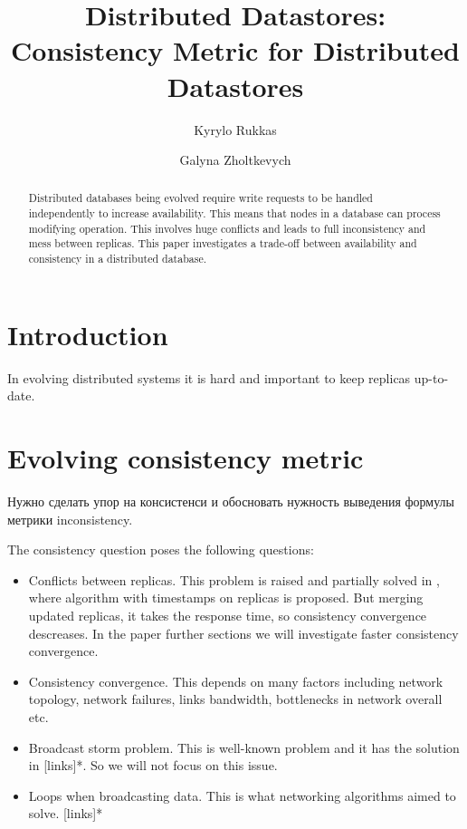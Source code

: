 \documentclass{llncs}
\begin{document}
\title{Distributed Datastores: Consistency Metric for Distributed Datastores}
\author{Kyrylo Rukkas\and Galyna Zholtkevych}
\maketitle
\begin{abstract}
Distributed databases being evolved require write requests to be handled independently to increase availability.
This means that nodes in a database can process modifying operation. This involves huge conflicts and leads to
full inconsistency and mess between replicas. This paper investigates a trade-off between availability and consistency
in a distributed database.
\end{abstract}

\section{Introduction}\label{sec:intro}
In evolving distributed systems it is hard and important to keep replicas up-to-date.

\section{Evolving consistency metric}
Нужно сделать упор на консистенси и обосновать нужность выведения формулы метрики inconsistency.


The consistency question poses the following questions:
\begin{itemize}
\item Conflicts between replicas. This problem is raised and partially solved in 
\cite{bib:c_ts}, where algorithm with timestamps on replicas is proposed. But merging
updated replicas, it takes the response time, so consistency convergence descreases.
In the paper further sections we will investigate faster consistency convergence.
\item Consistency convergence. This depends on many factors including network topology,
network failures, links bandwidth, bottlenecks in network overall etc.
\item Broadcast storm problem. This is well-known problem and it has the solution in [links]*.
So we will not focus on this issue.
\item Loops when broadcasting data. This is what networking algorithms aimed to solve. [links]*
\end{itemize}
\end{document}
